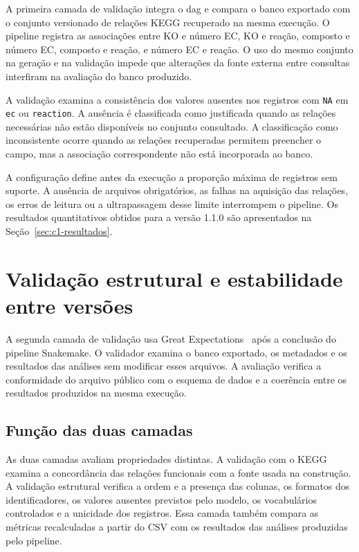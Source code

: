 A primeira camada de validação integra o \gls{dag} e compara o banco exportado
com o conjunto versionado de relações KEGG recuperado na mesma execução. O
pipeline registra as associações entre KO e número EC, KO e reação, composto
e número EC, composto e reação, e número EC e reação. O uso do mesmo conjunto
na geração e na validação impede que alterações da fonte externa entre
consultas interfiram na avaliação do banco produzido.

A validação examina a consistência dos valores ausentes nos registros com
\texttt{NA} em \texttt{ec} ou \texttt{reaction}. A ausência é classificada
como justificada quando as relações necessárias não estão disponíveis no
conjunto consultado. A classificação como inconsistente ocorre quando as
relações recuperadas permitem preencher o campo, mas a associação
correspondente não está incorporada ao banco.


A configuração define antes da execução a proporção máxima de registros sem
suporte. A ausência de arquivos obrigatórios, as falhas na aquisição das
relações, os erros de leitura ou a ultrapassagem desse limite interrompem o
pipeline. Os resultados quantitativos obtidos para a versão 1.1.0 são
apresentados na Seção~\ref{sec:c1-resultados}.

\section{Validação estrutural e estabilidade entre versões}
\label{sec:c1-validacao-gx}

A segunda camada de validação usa Great
Expectations~\citep{greatexpectations} após a conclusão do pipeline
Snakemake. O validador examina o banco exportado, os metadados e os resultados
das análises sem modificar esses arquivos. A avaliação verifica a conformidade
do arquivo público com o esquema de dados e a coerência entre os resultados
produzidos na mesma execução.

\subsection{Função das duas camadas}

As duas camadas avaliam propriedades distintas. A validação com o KEGG examina
a concordância das relações funcionais com a fonte usada na construção. A
validação estrutural verifica a ordem e a presença das colunas, os formatos
dos identificadores, os valores ausentes previstos pelo modelo, os
vocabulários controlados e a unicidade dos registros. Essa camada também
compara as métricas recalculadas a partir do CSV com os resultados das análises
produzidas pelo pipeline.

